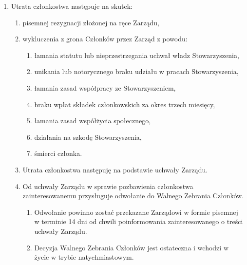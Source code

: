 \documentclass{article}
\begin{document}
\begin{enumerate}
    \item Utrata członkostwa następuje na skutek:
      \begin{enumerate}
        \item pisemnej rezygnacji złożonej na ręce Zarządu,
        \item wykluczenia z grona Członków przez Zarząd z powodu:
          \begin{enumerate}
            \item łamania statutu lub nieprzestrzegania uchwał władz Stowarzyszenia,
            \item unikania lub notorycznego braku udziału w pracach Stowarzyszenia,
            \item łamania zasad współpracy ze Stowarzyszeniem,
            \item braku wpłat składek członkowskich za okres trzech miesięcy,
            \item łamania zasad współżycia społecznego,
            \item działania na szkodę Stowarzyszenia,
            \item śmierci członka.
          \end{enumerate}
        \item Utrata członkostwa następuję na podstawie uchwały Zarządu.
        \item Od uchwały Zarządu w sprawie pozbawienia członkostwa zainteresowanemu przysługuje odwołanie do Walnego Zebrania Członków.
          \begin{enumerate}
            \item Odwołanie powinno zostać przekazane Zarządowi w formie pisemnej w terminie 14 dni od chwili poinformowania zainteresowanego o treści uchwały Zarządu.
            \item Decyzja Walnego Zebrania Członków jest ostateczna i wchodzi w życie w trybie natychmiastowym.
          \end{enumerate}
      \end{enumerate}
  \end{enumerate}
\end{document}
